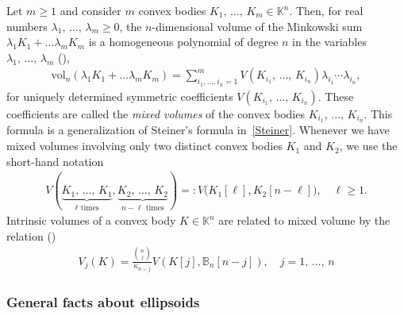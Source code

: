 \documentclass[10pt]{amsart}
\theoremstyle{definition}\newtheorem{defi}[theo]{Definition}\newtheorem{rema}[theo]{Remark}\newtheorem{exam}[theo]{Example}\newtheorem{exem}[theo]{Example}\newtheorem{nota}[theo]{Notation}
\newcommand{\rvol}{\mathrm{vol}}
\newcommand{\bbB}{\mathbb{B}}
\newcommand{\bbK}{\mathbb{K}}
\begin{document}
Let $m \geq 1$ and consider $m$ convex bodies $K_1,\,\ldots,\,K_m \in \bbK^n$. Then, for real numbers $\lambda_1,\,\ldots,\,\lambda_m \geq0$, the $n$-dimensional volume of the Minkowski sum $\lambda_1K_1+\ldots \lambda_mK_m$ is a homogeneous polynomial of degree $n$ in the variables $\lambda_1,\,\ldots,\,\lambda_m$ (\cite[Eq.~(14.7)]{Schneider}),
\begin{gather*}
\rvol_n(\lambda_1K_1+\ldots \lambda_mK_m) = \sum_{i_1,\ldots,i_n=1}^m V(K_{i_1},\,\ldots,\,K_{i_n}) \lambda_{i_1}\cdots \lambda_{i_n},
\end{gather*}
for uniquely determined symmetric coefficients $V(K_{i_1},\,\ldots,\,K_{i_n})$. These coefficients are called the \emph{mixed volumes} of the convex bodies $K_{i_1},\,\ldots,\,K_{i_n}$. This formula is a generalization of Steiner's formula in~\eqref{Steiner}. Whenever we have mixed volumes involving only two distinct convex bodies $K_1$ and $K_2$, we use the short-hand notation
\begin{gather}\label{Eq:NotationVol}
V(\underbrace{K_1,\,\ldots,\,K_1}_{\ell \textrm{ times}},
\underbrace{K_2,\,\ldots,\,K_2}_{n-\ell \textrm{ times}}) =: V\big(K_1[\ell],K_2[n-\ell]\big), \quad \ell \geq1.
\end{gather}
Intrinsic volumes of a convex body $K \in \bbK^n$ are related to mixed volume by the relation (\cite[Eq.~(14.18)]{Schneider})
\begin{gather}\label{IntMix}
V_j(K) = \frac{\binom{n}{j}}{\kappa_{n-j}} V(K[j],\bbB_n[n-j]), \quad j=1,\,\ldots,\,n
\end{gather}

\subsubsection*{General facts about ellipsoids}
\end{document}
